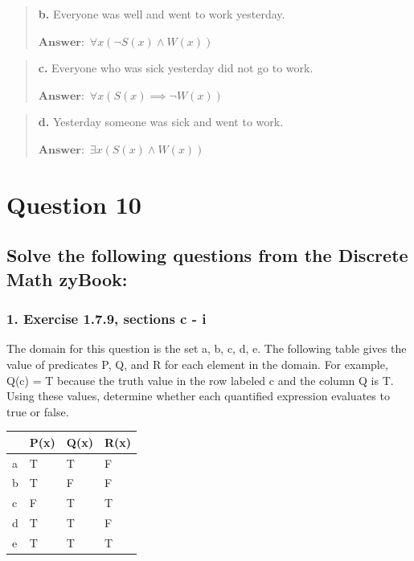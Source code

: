 \documentclass[11pt, oneside]{article}
\begin{document}
\begin{quote}
    \textbf{b. }Everyone was well and went to work yesterday.

    \(\textbf{Answer:}\enspace \forall x(\neg S(x) \land W(x))\)
\end{quote}

\begin{quote}
    \textbf{c. }Everyone who was sick yesterday did not go to work.

    \(\textbf{Answer:}\enspace \forall x(S(x) \implies \neg W(x))\)
\end{quote}

\begin{quote}
    \textbf{d. }Yesterday someone was sick and went to work.

    \(\textbf{Answer:}\enspace \exists x(S(x) \land W(x))\)
\end{quote}

\pagebreak

\section*{Question 10}

\subsection*{Solve the following questions from the Discrete Math zyBook:}

\subsubsection*{1. Exercise 1.7.9, sections c - i}

The domain for this question is the set {a, b, c, d, e}. The following table gives the value of predicates P, Q, and R for each element in the domain. For example, Q(c) = T because the truth value in the row labeled c and the column Q is T. Using these values, determine whether each quantified expression evaluates to true or false.

\begin{tabular}{ |p{0.5cm}|p{1.5cm}|p{1.5cm}|p{1.5cm}|  }
    \hline
    \enspace & P(x) & Q(x) & R(x) \\
    \hline
    a & T & T & F \\
    b & T & F & F \\
    c & F & T & T \\
    d & T & T & F \\
    e & T & T & T \\
    \hline
\end{tabular}
\end{document}
